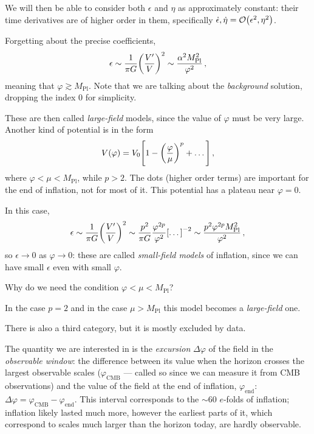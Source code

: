 \documentclass[main.tex]{subfiles}
\begin{document}
We will then be able to consider both \(\epsilon \) and \(\eta\) as approximately constant: their time derivatives are of higher order in them, specifically \(\dot{\epsilon}, \dot{\eta} = \order{\epsilon^2, \eta^2}\).

Forgetting about the precise coefficients, 
%
\begin{align}
\epsilon \sim \frac{1}{\pi G} \qty(\frac{V'}{V})^2 \sim \frac{\alpha^2 M _{\text{Pl}}^2}{\varphi^2}
\,,
\end{align}
%
meaning that \(\varphi \gtrsim M _{\text{Pl}}\). 
Note that we are talking about the \emph{background} solution, dropping the index \(0\) for simplicity.

These are then called \emph{large-field} models, since the value of \(\varphi \) must be very large. 
Another kind of potential is in the form 
%
\begin{align}
V(\varphi ) = V_0 \qty[1 - \qty(\frac{\varphi }{\mu })^{p } + \dots]
\,,
\end{align}
%
where \(\varphi < \mu < M _{\text{Pl}}\), while \(p > 2\). 
The dots (higher order terms) are important for the end of inflation, not for most of it. 
This potential has a plateau near \(\varphi = 0\).

In this case, 
%
\begin{align}
\epsilon \sim \frac{1}{\pi G} \qty(\frac{V'}{V})^2
\sim \frac{p^2}{\pi G} \frac{\varphi^{2 p }}{\varphi^2}  \qty[\dots]^{-2} 
\sim \frac{p^2 \varphi^{2p} M _{\text{Pl}}^2}{\varphi^2} 
\,,
\end{align}
%
so \(\epsilon \to 0\) as \(\varphi \to 0\): these are called \emph{small-field models} of inflation, since we can have small \(\epsilon \) even with small \(\varphi \).

Why do we need the condition \(\varphi < \mu < M _{\text{Pl}}\)? 

\begin{claim}
In the case \(p = 2\) and in the case \(\mu > M _{\text{Pl}}\) this model becomes a \emph{large-field} one. 
\end{claim}

There is also a third category, but it is mostly excluded by data. 

The quantity we are interested in is the \emph{excursion} \(\Delta \varphi \) of the field in the \emph{observable window}: the difference between its value when the horizon crosses the largest observable scales (\(\varphi _{\text{CMB}}\) --- called so since we can measure it from CMB observations) and the value of the field at the end of inflation, \(\varphi _{\text{end}}\): \(\Delta \varphi = \varphi _{\text{CMB}} - \varphi _{\text{end}}\). 
This interval corresponds to the \(\sim 60\) \(e\)-folds of inflation; inflation likely lasted much more, however the earliest parts of it, which correspond to scales much larger than the horizon today, are hardly observable. 
\end{document}
